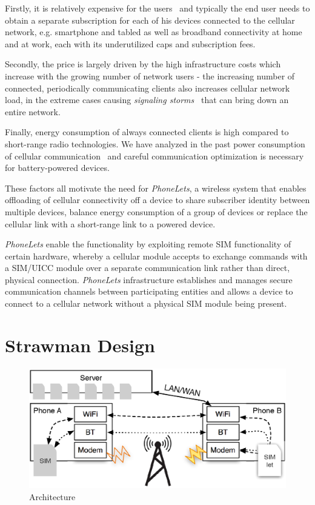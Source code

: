 \documentclass{sig-alternate-10pt}
\begin{document}
Firstly, it is relatively expensive for the users~\cite{Anonymous:2013ut} and typically the end user needs to obtain a separate subscription for each of his devices connected to the cellular network, e.g. smartphone and tabled as well as broadband connectivity at home and at work, each with its underutilized caps and subscription fees.

Secondly, the price is largely driven by the high infrastructure costs which increase with the growing number of network users - the increasing number of connected, periodically communicating clients also increases cellular network load, in the extreme cases causing \emph{signaling storms}~\cite{Yang:wh} that can bring down an entire network.

Finally, energy consumption of always connected clients is high compared to short-range radio technologies. We have analyzed in the past power consumption of cellular communication~\cite{Aucinas:2013uk} and careful communication optimization is necessary for battery-powered devices.

These factors all motivate the need for \emph{PhoneLets}, a wireless system that enables offloading of cellular connectivity off a device to share subscriber identity between multiple devices, balance energy consumption of a group of devices or replace the cellular link with a short-range link to a powered device.

\emph{PhoneLets} enable the functionality by exploiting remote SIM functionality of certain hardware, whereby a cellular module accepts to exchange commands with a SIM/UICC module over a separate communication link rather than direct, physical connection. \emph{PhoneLets} infrastructure establishes and manages secure communication channels between participating entities and allows a device to connect to a cellular network without a physical SIM module being present.


\section{Strawman Design}

\begin{figure}
\centering
\includegraphics[width=0.9\columnwidth]{figs/arch}
\vspace{-3mm}
\caption{Architecture}
\label{fig:arch}
\vspace{-5mm}
\end{figure}
\end{document}
